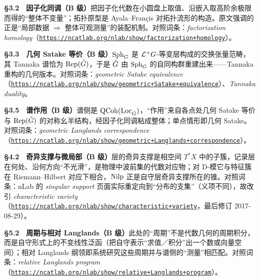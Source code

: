\smallskip
\noindent\textbf{§3.2　因子化同调（B 级）}\quad 把因子化代数在小圆盘上取值、沿嵌入取高阶余极限而得的“整体不变量”；拓扑原型是 Ayala--Françis 对拓扑流形的构造。原文强调的正是“局部数据 $\Rightarrow$ 整体可观测量”的装配机制。对照词条：\emph{factorization homology}（\href{https://ncatlab.org/nlab/show/factorization+homology}{\texttt{https:/\allowbreak{}/\allowbreak{}ncatlab.\allowbreak{}org/\allowbreak{}nlab/\allowbreak{}show/\allowbreak{}factorization+\allowbreak{}homology}}）。

\smallskip
\noindent\textbf{§3.3　几何 Satake 等价（B 级）}\quad $\operatorname{Sph}_{G}$ 是 $\mathcal{L}^{+}G$-等变层构成的交换张量范畴，其 Tannaka 谱恰为 $\operatorname{Rep}(\check{G})$，于是 $\check{G}$ 由 $\operatorname{Sph}_{G}$ 的自同构群重建出来——Tannaka 重构的几何版本。对照词条：\emph{geometric Satake equivalence}（\href{https://ncatlab.org/nlab/show/geometric+Satake+equivalence}{\texttt{https:/\allowbreak{}/\allowbreak{}ncatlab.\allowbreak{}org/\allowbreak{}nlab/\allowbreak{}show/\allowbreak{}geometric+\allowbreak{}Satake+\allowbreak{}equivalence}}）、\emph{Tannaka duality}。

\smallskip
\noindent\textbf{§3.5　谱作用（B 级）}\quad 谱侧是 $\operatorname{QCoh}(\operatorname{Loc}_{\check{G}})$，“作用”来自各点处几何 Satake 等价与 $\operatorname{Rep}(\check{G})$ 的对称幺半结构，经因子化同调粘成整体；单点情形即几何 Satake。对照词条：\emph{geometric Langlands correspondence}（\href{https://ncatlab.org/nlab/show/geometric+Langlands+correspondence}{\texttt{https:/\allowbreak{}/\allowbreak{}ncatlab.\allowbreak{}org/\allowbreak{}nlab/\allowbreak{}show/\allowbreak{}geometric+\allowbreak{}Langlands+\allowbreak{}correspondence}}）。

\smallskip
\noindent\textbf{§4.2　奇异支撑与微局部（B 级）}\quad 层的奇异支撑是相空间 $T^{*}X$ 中的子簇，记录层在何处、沿何方向“不光滑”，是物理中波前集的代数对应物；对 D-模它与特征簇在 Riemann--Hilbert 对应下相合，$\operatorname{Nilp}$ 正是自守层奇异支撑所在的锥。对照词条：nLab 的 \emph{singular support} 页面实际重定向到“分布的支集”（义项不同），故改引 \emph{characteristic variety}（\href{https://ncatlab.org/nlab/show/characteristic+variety}{\texttt{https:/\allowbreak{}/\allowbreak{}ncatlab.\allowbreak{}org/\allowbreak{}nlab/\allowbreak{}show/\allowbreak{}characteristic+\allowbreak{}variety}}，最后修订 2017-08-29）。

\smallskip
\noindent\textbf{§5.2　周期与相对 Langlands（B 级）}\quad 此处的“周期”不是代数几何的周期积分，而是自守形式上的不变线性泛函（把自守表示“求值／积分”出一个数或向量空间）；相对 Langlands 纲领即系统研究这些周期并与谱侧的“测量”相匹配。对照词条：\emph{relative Langlands program}（\href{https://ncatlab.org/nlab/show/relative+Langlands+program}{\texttt{https:/\allowbreak{}/\allowbreak{}ncatlab.\allowbreak{}org/\allowbreak{}nlab/\allowbreak{}show/\allowbreak{}relative+\allowbreak{}Langlands+\allowbreak{}program}}）。

